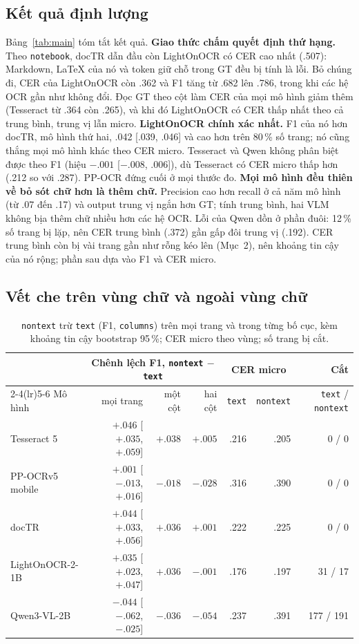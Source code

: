 \documentclass[10pt,a4paper]{article}
\begin{document}
\subsection{Kết quả định lượng}
Bảng~\ref{tab:main} tóm tắt kết quả. \textbf{Giao thức chấm quyết định thứ hạng.} Theo \texttt{notebook}, docTR
dẫn đầu còn LightOnOCR có CER cao nhất (.507): Markdown, LaTeX của nó và token giữ chỗ trong GT đều bị tính là
lỗi. Bỏ chúng đi, CER của LightOnOCR còn .362 và F1 tăng từ .682 lên .786, trong khi các hệ OCR gần như không
đổi. Đọc GT theo cột làm CER của mọi mô hình giảm thêm (Tesseract từ .364 còn .265), và khi đó LightOnOCR có
CER thấp nhất theo cả trung bình, trung vị lẫn micro.
\textbf{LightOnOCR chính xác nhất.} F1 của nó hơn docTR, mô hình thứ hai, .042 [.039, .046] và cao hơn trên
80\,\% số trang; nó cũng thắng mọi mô hình khác theo CER micro. Tesseract và Qwen không phân biệt được theo F1
(hiệu $-.001$ [$-.008$, $.006$]), dù Tesseract có CER micro thấp hơn (.212 so với .287). PP-OCR đứng cuối ở mọi
thước đo.
\textbf{Mọi mô hình đều thiên về bỏ sót chữ hơn là thêm chữ.} Precision cao hơn recall ở cả năm mô hình (từ .07
đến .17) và output trung vị ngắn hơn GT; tính trung bình, hai VLM không bịa thêm chữ nhiều hơn các hệ OCR. Lỗi
của Qwen dồn ở phần đuôi: 12\,\% số trang bị lặp, nên CER trung bình (.372) gần gấp đôi trung vị (.192). CER
trung bình còn bị vài trang gần như rỗng kéo lên (Mục~2), nên khoảng tin cậy của nó rộng; phần sau dựa vào F1
và CER micro.

\subsection{Vết che trên vùng chữ và ngoài vùng chữ}
\begin{table}[t]
\centering\footnotesize
\caption{\texttt{nontext} trừ \texttt{text} (F1, \texttt{columns}) trên mọi trang và trong từng bố cục, kèm
khoảng tin cậy bootstrap 95\,\%; CER micro theo vùng; số trang bị cắt.}
\label{tab:region}
\begin{tabular}{@{}lrrrrrr@{}}
\toprule
& \multicolumn{3}{c}{Chênh lệch F1, \texttt{nontext} $-$ \texttt{text}} & \multicolumn{2}{c}{CER micro} & Cắt \\
\cmidrule(lr){2-4}\cmidrule(lr){5-6}
Mô hình & mọi trang & một cột & hai cột & \texttt{text} & \texttt{nontext} & \texttt{text} / \texttt{nontext} \\
\midrule
Tesseract 5     & $+.046$ [$+.035$, $+.059$] & $+.038$ & $+.005$ & .216 & .205 & 0 / 0 \\
PP-OCRv5 mobile & $+.001$ [$-.013$, $+.016$] & $-.018$ & $-.028$ & .316 & .390 & 0 / 0 \\
docTR           & $+.044$ [$+.033$, $+.056$] & $+.036$ & $+.001$ & .222 & .225 & 0 / 0 \\
LightOnOCR-2-1B & $+.035$ [$+.023$, $+.047$] & $+.036$ & $-.001$ & .176 & .197 & 31 / 17 \\
Qwen3-VL-2B     & $-.044$ [$-.062$, $-.025$] & $-.036$ & $-.054$ & .237 & .391 & 177 / 191 \\
\bottomrule
\end{tabular}
\end{table}
\end{document}
